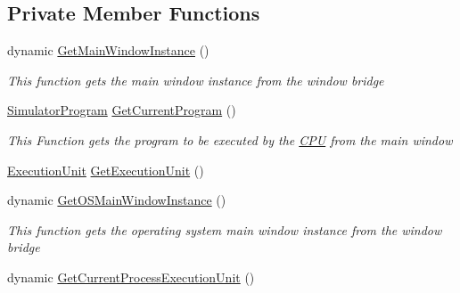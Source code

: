 \subsection*{Private Member Functions}
\begin{DoxyCompactItemize}
\item 
dynamic \hyperlink{class_c_p_u___o_s___simulator_1_1_c_p_u_1_1_interrupts_1_1_polled_interrupt_aef257ecaba1646638b72f9af37b4c204}{Get\+Main\+Window\+Instance} ()
\begin{DoxyCompactList}\small\item\em This function gets the main window instance from the window bridge \end{DoxyCompactList}\item 
\hyperlink{class_c_p_u___o_s___simulator_1_1_c_p_u_1_1_simulator_program}{Simulator\+Program} \hyperlink{class_c_p_u___o_s___simulator_1_1_c_p_u_1_1_interrupts_1_1_polled_interrupt_ad1686a1ba911aa379d9aaae83558047e}{Get\+Current\+Program} ()
\begin{DoxyCompactList}\small\item\em This Function gets the program to be executed by the \hyperlink{namespace_c_p_u___o_s___simulator_1_1_c_p_u}{C\+P\+U} from the main window \end{DoxyCompactList}\item 
\hyperlink{class_c_p_u___o_s___simulator_1_1_c_p_u_1_1_execution_unit}{Execution\+Unit} \hyperlink{class_c_p_u___o_s___simulator_1_1_c_p_u_1_1_interrupts_1_1_polled_interrupt_a50a981ea728e6b8bb05a63a45448549e}{Get\+Execution\+Unit} ()
\item 
dynamic \hyperlink{class_c_p_u___o_s___simulator_1_1_c_p_u_1_1_interrupts_1_1_polled_interrupt_af2d83686896de5b07bc5e376f0406ee5}{Get\+O\+S\+Main\+Window\+Instance} ()
\begin{DoxyCompactList}\small\item\em This function gets the operating system main window instance from the window bridge \end{DoxyCompactList}\item 
dynamic \hyperlink{class_c_p_u___o_s___simulator_1_1_c_p_u_1_1_interrupts_1_1_polled_interrupt_a0e682077c925b534e5877a51ad9e1e91}{Get\+Current\+Process\+Execution\+Unit} ()
\end{DoxyCompactItemize}
